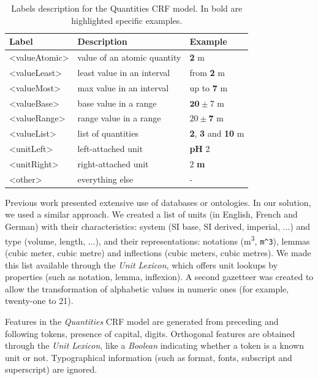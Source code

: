 \begin{table}[ht]
  \caption{Labels description for the Quantities CRF model. In bold are highlighted specific examples.}
  \label{tab:quantities-model-labels}
  \begin{tabular}{lll}
    \toprule
    Label & Description & Example\\
    \midrule
    <valueAtomic> & value of an atomic quantity & \textbf{2} m \\
    <valueLeast> & least value in an interval & from \textbf{2} m \\
    <valueMost> & max value in an interval & up to \textbf{7} m \\
    <valueBase> & base value in a range & $\textbf{20}\pm7$ m \\
    <valueRange> & range value in a range & $20 \pm \textbf{7}$ m \\
    <valueList> & list of quantities & \textbf{2}, \textbf{3} and \textbf{10} m \\
    <unitLeft> & left-attached unit & \textbf{pH} 2 \\
    <unitRight> & right-attached unit & 2 \textbf{m} \\
    <other> & everything else & - \\
  \bottomrule
\end{tabular}
\end{table}

Previous work presented extensive use of databases or ontologies. In our solution, we used a similar approach. We created a list of units (in English, French and German) with their characteristics: system (SI base, SI derived, imperial, ...) and type (volume, length, ...), and their representations: notations (m\textsuperscript{3}, \texttt{m\^{}3}), lemmas (cubic meter, cubic metre) and inflections (cubic meters, cubic metres). We made this list available through the \textit{Unit Lexicon}, which offers unit lookups by properties (such as notation, lemma, inflexion). A second gazetteer was created to allow the transformation of alphabetic values in numeric ones (for example, twenty-one to 21).

Features in the \textit{Quantities} CRF model are generated from preceding and following tokens, presence of capital, digits. Orthogonal features are obtained through the \textit{Unit Lexicon}, like a \textit{Boolean} indicating whether a token is a known unit or not. Typographical information (such as format, fonts, subscript and superscript) are ignored. 

